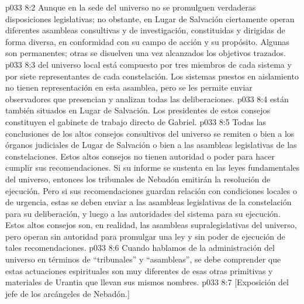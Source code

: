\vs p033 8:2 Aunque en la sede del universo no se promulguen verdaderas disposiciones legislativas; no obstante, en Lugar de Salvación ciertamente operan diferentes asambleas consultivas y de investigación, constituidas y dirigidas de forma diversa, en conformidad con su campo de acción y su propósito. Algunas son permanentes; otras se disuelven una vez alcanzados los objetivos trazados.
\vs p033 8:3 \pc {} del universo local está compuesto por tres miembros de cada sistema y por siete representantes de cada constelación. Los sistemas puestos en aislamiento no tienen representación en esta asamblea, pero se les permite enviar observadores que presencian y analizan todas las deliberaciones.
\vs p033 8:4 \pc {} están también situados en Lugar de Salvación. Los presidentes de estos consejos constituyen el gabinete de trabajo directo de Gabriel.
\vs p033 8:5 \pc Todas las conclusiones de los altos consejos consultivos del universo se remiten o bien a los órganos judiciales de Lugar de Salvación o bien a las asambleas legislativas de las constelaciones. Estos altos consejos no tienen autoridad o poder para hacer cumplir sus recomendaciones. Si su informe se sustenta en las leyes fundamentales del universo, entonces los tribunales de Nebadón emitirán la resolución de ejecución. Pero si sus recomendaciones guardan relación con condiciones locales o de urgencia, estas se deben enviar a las asambleas legislativas de la constelación para su deliberación, y luego a las autoridades del sistema para su ejecución. Estos altos consejos son, en realidad, las asambleas supralegislativas del universo, pero operan sin autoridad para promulgar una ley y sin poder de ejecución de tales recomendaciones.
\vs p033 8:6 Cuando hablamos de la administración del universo en términos de “tribunales” y “asambleas”, se debe comprender que estas actuaciones espirituales son muy diferentes de esas otras primitivas y materiales de Urantia que llevan sus mismos nombres.
\vsetoff
\vs p033 8:7 [Exposición del jefe de los arcángeles de Nebadón.]
